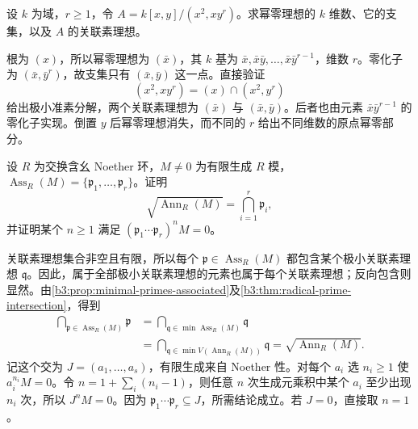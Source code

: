 \begin{exercise}\label{b3:ex:04-embedded-thickness}
	设 \(k\) 为域，\(r\ge1\)，令 \(A=k[x,y]/(x^2,xy^r)\)。求幂零理想的 \(k\) 维数、它的支集，以及 \(A\) 的关联素理想。
\end{exercise}
\begin{solution}
	根为 \((x)\)，所以幂零理想为 \((\bar x)\)，其 \(k\) 基为 \(\bar x,\bar x\bar y,\ldots,\bar x\bar y^{r-1}\)，维数 \(r\)。零化子为 \((\bar x,\bar y^r)\)，故支集只有 \((\bar x,\bar y)\) 这一点。直接验证
	\[
		(x^2,xy^r)=(x)\cap(x^2,y^r)
	\]
	给出极小准素分解，两个关联素理想为 \((\bar x)\) 与 \((\bar x,\bar y)\)。后者也由元素 \(\bar x\bar y^{r-1}\) 的零化子实现。倒置 \(y\) 后幂零理想消失，而不同的 \(r\) 给出不同维数的原点幂零部分。
\end{solution}

\begin{exercise}\label{b3:ex:04-annihilator-radical}
	设 \(R\) 为交换含幺 Noether 环，\(M\ne0\) 为有限生成 \(R\) 模，\(\operatorname{Ass}_R(M)=\{\mathfrak p_1,\ldots,\mathfrak p_r\}\)。证明
	\[
		\sqrt{\operatorname{Ann}_R(M)}=\bigcap_{i=1}^r\mathfrak p_i,
	\]
	并证明某个 \(n\ge1\) 满足 \((\mathfrak p_1\cdots\mathfrak p_r)^nM=0\)。
\end{exercise}
\begin{solution}
	关联素理想集合非空且有限，所以每个 \(\mathfrak p\in\operatorname{Ass}_R(M)\) 都包含某个极小关联素理想 \(\mathfrak q\)。因此，属于全部极小关联素理想的元素也属于每个关联素理想；反向包含则显然。由\cref{b3:prop:minimal-primes-associated}及\cref{b3:thm:radical-prime-intersection}，得到
	\[
		\begin{aligned}
			\bigcap_{\mathfrak p\in\operatorname{Ass}_R(M)}\mathfrak p &=\bigcap_{\mathfrak q\in\min\operatorname{Ass}_R(M)}\mathfrak q\\
			&=\bigcap_{\mathfrak q\in\min V(\operatorname{Ann}_R(M))}\mathfrak q =\sqrt{\operatorname{Ann}_R(M)}.
		\end{aligned}
	\]
	记这个交为 \(J=(a_1,\ldots,a_s)\)，有限生成来自 Noether 性。对每个 \(a_i\) 选 \(n_i\ge1\) 使 \(a_i^{n_i}M=0\)。令 \(n=1+\sum_i(n_i-1)\)，则任意 \(n\) 次生成元乘积中某个 \(a_i\) 至少出现 \(n_i\) 次，所以 \(J^nM=0\)。因为 \(\mathfrak p_1\cdots\mathfrak p_r\subseteq J\)，所需结论成立。若 \(J=0\)，直接取 \(n=1\)。
\end{solution}
